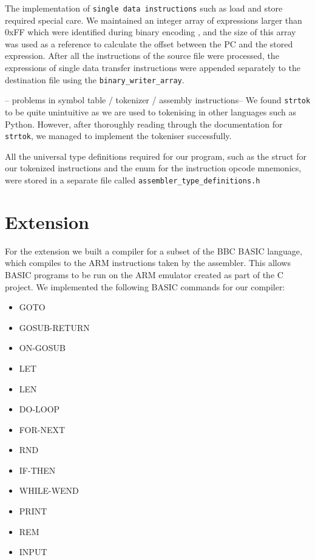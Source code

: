 \documentclass[11pt, letterpaper]{article}
\begin{document}
The implementation of \verb|single data instructions| such as load and store required special care. We maintained an integer array of expressions larger than 0xFF which were identified during binary encoding , and the size of this array was used as a reference to calculate the offset between the PC and the stored expression. After all the instructions of the source file were processed, the expressions of single data transfer instructions were appended separately to the destination file using the \verb|binary_writer_array|.
\\ \newline

-- problems in symbol table / tokenizer / assembly instructions--
We found \verb|strtok| to be quite unintuitive as we are used to tokenising in other languages such as Python. However, after thoroughly reading through the documentation for \verb|strtok|, we managed to implement the tokeniser successfully.

All the universal type definitions required for our program, such as the struct for our tokenized instructions and the enum for the instruction opcode mnemonics, were stored in a separate file called \verb|assembler_type_definitions.h|

\section{Extension}

For the extension we built a compiler for a subset of the BBC BASIC language, which compiles to the ARM instructions taken by the assembler. This allows BASIC programs to be run on the ARM emulator created as part of the C project. We implemented the following BASIC commands for our compiler:
\begin{itemize}
\item GOTO
\item GOSUB-RETURN
\item ON-GOSUB
\item LET
\item LEN
\item DO-LOOP
\item FOR-NEXT
\item RND
\item IF-THEN
\item WHILE-WEND
\item PRINT 
\item REM
\item INPUT 
\end{itemize}
\end{document}
